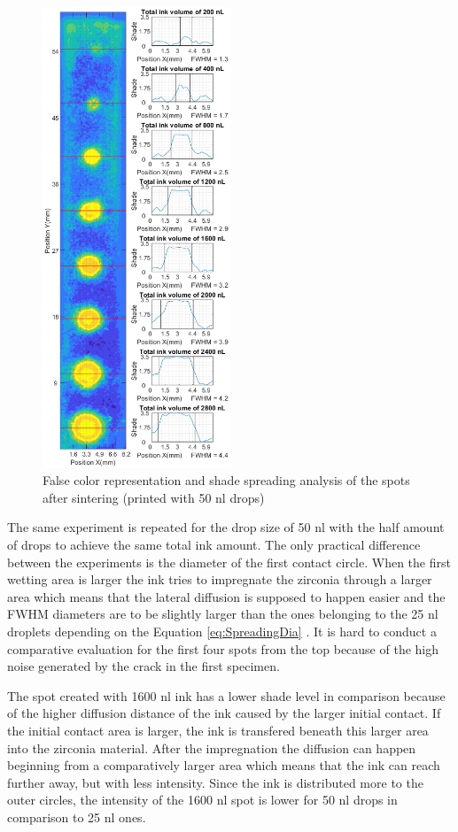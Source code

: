 \begin{figure}[H]
	\centering
	\includegraphics[width=0.5\textwidth]{grafiken/drops50.eps}
	\caption{False color representation and shade spreading analysis of the spots after sintering (printed with 50 nl drops)}
	\label{fig:drops50}
\end{figure} 

\bigskip 
 The same experiment is repeated for the drop size of 50 nl with the half amount of drops to achieve the same total ink amount. The only practical difference between the experiments is the diameter of the first contact circle. When the first wetting area is larger the ink tries to impregnate the zirconia through a larger area which means that the lateral diffusion is supposed to happen easier and the FWHM diameters are to be slightly larger than the ones belonging to the 25 nl droplets depending on the Equation \ref{eq:SpreadingDia} . It is hard to conduct a comparative evaluation for the first four spots from the top because of the high noise generated by the crack in the first specimen. 
 
 The spot created with 1600 nl ink has a lower shade level in comparison because of the higher diffusion distance of the ink caused by the larger initial contact. If the initial contact area is larger, the ink is transfered beneath this larger area into the zirconia material. After the impregnation the diffusion can happen beginning from a comparatively larger area which means that the ink can reach further away, but with less intensity. Since the ink is distributed more to the outer circles, the intensity of the 1600 nl spot is lower for 50 nl drops in comparison to 25 nl ones.
  
